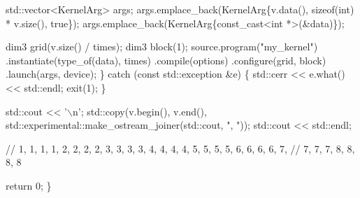 \begin{DoxyCodeInclude}
    std::vector<KernelArg> args;
    args.emplace\_back(KernelArg\{v.data(), \textcolor{keyword}{sizeof}(int) * v.size(), \textcolor{keyword}{true}\});
    args.emplace\_back(KernelArg\{\textcolor{keyword}{const\_cast<}\textcolor{keywordtype}{int} *\textcolor{keyword}{>}(&data)\});

    dim3 grid(v.size() / times);
    dim3 block(1);
    source.program(\textcolor{stringliteral}{"my\_kernel"})
        .instantiate(type\_of(data), times)
        .compile(options)
        .configure(grid, block)
        .launch(args, device);
  \} \textcolor{keywordflow}{catch} (\textcolor{keyword}{const} std::exception &e) \{
    std::cerr << e.what() << std::endl;
    exit(1);
  \}

  std::cout << \textcolor{charliteral}{'\(\backslash\)n'};
  std::copy(v.begin(), v.end(),
            std::experimental::make\_ostream\_joiner(std::cout, \textcolor{stringliteral}{", "}));
  std::cout << std::endl;

  \textcolor{comment}{// 1, 1, 1, 1, 2, 2, 2, 2, 3, 3, 3, 3, 4, 4, 4, 4, 5, 5, 5, 5, 6, 6, 6, 6, 7,}
  \textcolor{comment}{// 7, 7, 7, 8, 8, 8, 8}

  \textcolor{keywordflow}{return} 0;
\}
\end{DoxyCodeInclude}
 